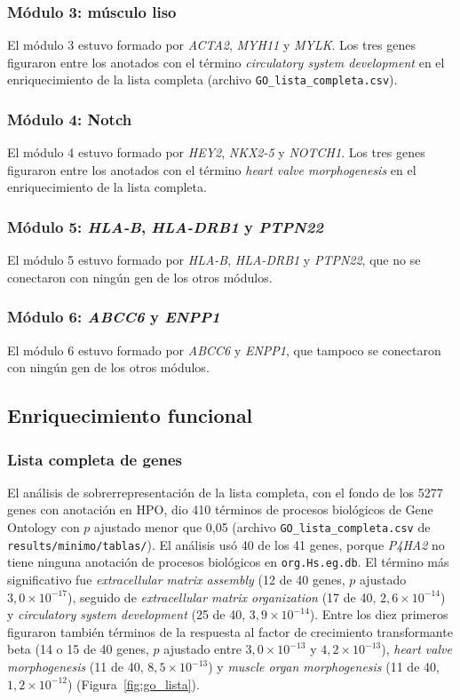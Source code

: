 \subsubsection{Módulo 3: músculo liso}
El módulo 3 estuvo formado por \textit{ACTA2}, \textit{MYH11} y \textit{MYLK}. Los tres genes figuraron entre los anotados con el término \textit{circulatory system development} en el enriquecimiento de la lista completa (archivo \texttt{GO\_lista\_completa.csv}).

\subsubsection{Módulo 4: Notch}
El módulo 4 estuvo formado por \textit{HEY2}, \textit{NKX2-5} y \textit{NOTCH1}. Los tres genes figuraron entre los anotados con el término \textit{heart valve morphogenesis} en el enriquecimiento de la lista completa.

\subsubsection{Módulo 5: \textit{HLA-B}, \textit{HLA-DRB1} y \textit{PTPN22}}
El módulo 5 estuvo formado por \textit{HLA-B}, \textit{HLA-DRB1} y \textit{PTPN22}, que no se conectaron con ningún gen de los otros módulos.

\subsubsection{Módulo 6: \textit{ABCC6} y \textit{ENPP1}}
El módulo 6 estuvo formado por \textit{ABCC6} y \textit{ENPP1}, que tampoco se conectaron con ningún gen de los otros módulos.

\subsection{Enriquecimiento funcional}
\subsubsection{Lista completa de genes}
El análisis de sobrerrepresentación de la lista completa, con el fondo de los 5277 genes con anotación en HPO, dio 410 términos de procesos biológicos de Gene Ontology con $p$ ajustado menor que 0,05 (archivo \texttt{GO\_lista\_completa.csv} de \texttt{results/minimo/tablas/}). El análisis usó 40 de los 41 genes, porque \textit{P4HA2} no tiene ninguna anotación de procesos biológicos en \texttt{org.Hs.eg.db}. El término más significativo fue \textit{extracellular matrix assembly} (12 de 40 genes, $p$ ajustado $3{,}0\times10^{-17}$), seguido de \textit{extracellular matrix organization} (17 de 40, $2{,}6\times10^{-14}$) y \textit{circulatory system development} (25 de 40, $3{,}9\times10^{-14}$). Entre los diez primeros figuraron también términos de la respuesta al factor de crecimiento transformante beta (14 o 15 de 40 genes, $p$ ajustado entre $3{,}0\times10^{-13}$ y $4{,}2\times10^{-13}$), \textit{heart valve morphogenesis} (11 de 40, $8{,}5\times10^{-13}$) y \textit{muscle organ morphogenesis} (11 de 40, $1{,}2\times10^{-12}$) (Figura~\ref{fig:go_lista}).


